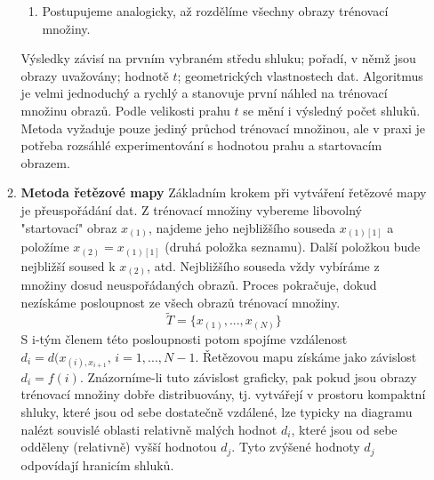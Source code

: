 \begin{enumerate}[label=(\Alph*)]
\begin{enumerate}[label=\arabic*.]
\begin{enumerate}[label=(\roman*)]
\item Postupujeme analogicky, až rozdělíme všechny obrazy trénovací množiny.
\end{enumerate}
Výsledky závisí na prvním vybraném středu shluku; pořadí, v němž jsou obrazy uvažovány; hodnotě $ t $; geometrických vlastnostech dat. Algoritmus je velmi jednoduchý a rychlý a stanovuje první náhled na trénovací množinu obrazů. Podle velikosti prahu $ t $ se mění i výsledný počet shluků. Metoda vyžaduje pouze jediný průchod trénovací množinou, ale v praxi je potřeba rozsáhlé experimentování s hodnotou prahu a startovacím obrazem.

\item \textbf{Metoda řetězové mapy}
Základním krokem při vytváření řetězové mapy je přeuspořádání dat. Z trénovací množiny vybereme libovolný "startovací" obraz $ x_{(1)} $, najdeme jeho nejbližšího souseda $ x_{(1)[1]} $ a položíme $ x_{(2)} = x_{(1)[1]} $ (druhá položka seznamu). Další položkou bude nejbližší soused k $ x_{(2)} $, atd. Nejbližšího souseda vždy vybíráme z množiny dosud neuspořádaných obrazů. Proces pokračuje, dokud nezískáme posloupnost ze všech obrazů trénovací množiny.
\begin{equation}
\tilde{T} = \{x_{(1)}, ..., x_{(N)}\}
\end{equation}
S i-tým členem této posloupnosti potom spojíme vzdálenost $ d_i = d(x_{(i), x_{i+1}}, \, i=1,...,N-1 $. Řetězovou mapu získáme jako závislost $ d_i = f(i) $. Znázorníme-li tuto závislost graficky, pak pokud jsou obrazy trénovací množiny dobře distribuovány, tj. vytvářejí v prostoru kompaktní shluky, které jsou od sebe dostatečně vzdálené, lze typicky na diagramu nalézt souvislé oblasti relativně malých hodnot $ d_i $, které jsou od sebe odděleny (relativně) vyšší hodnotou $ d_j $. Tyto zvýšené hodnoty $ d_j $ odpovídají hranicím shluků.


\end{enumerate}
\end{enumerate}
